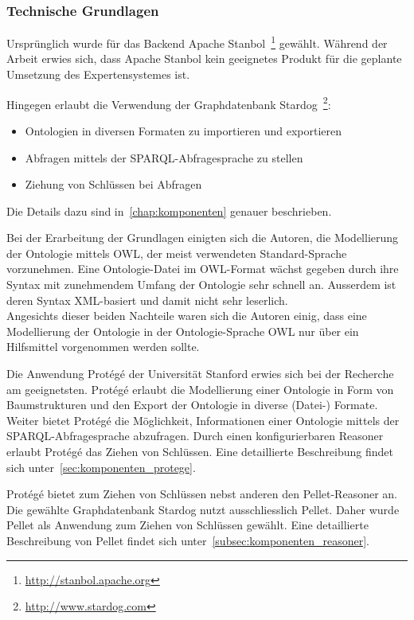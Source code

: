 \subsubsection{Technische Grundlagen}
\label{ssubsec:vorgehen:grundlagen:technisch}
Ursprünglich wurde für das Backend Apache Stanbol~\footnote{\url{http://stanbol.apache.org}} gewählt. Während der Arbeit erwies sich, dass Apache Stanbol kein geeignetes Produkt für die geplante Umsetzung des Expertensystemes ist.

Hingegen erlaubt die Verwendung der Graphdatenbank Stardog~\footnote{\url{http://www.stardog.com}}:
\begin{itemize}
    \item Ontologien in diversen Formaten zu importieren und exportieren
    \item Abfragen mittels der SPARQL-Abfragesprache zu stellen
    \item Ziehung von Schlüssen bei Abfragen
\end{itemize}
Die Details dazu sind in~\autoref{chap:komponenten} genauer beschrieben.

Bei der Erarbeitung der Grundlagen einigten sich die Autoren, die Modellierung der Ontologie mittels OWL, der meist verwendeten Standard-Sprache vorzunehmen. Eine Ontologie-Datei im OWL-Format wächst gegeben durch ihre Syntax mit zunehmendem Umfang der Ontologie sehr schnell an. Ausserdem ist deren Syntax XML-basiert und damit nicht sehr leserlich.\\
Angesichts dieser beiden Nachteile waren sich die Autoren einig, dass eine Modellierung der Ontologie in der Ontologie-Sprache OWL nur über ein Hilfsmittel vorgenommen werden sollte.

Die Anwendung Protégé der Universität Stanford erwies sich bei der Recherche am geeignetsten. Protégé erlaubt die Modellierung einer Ontologie in Form von Baumstrukturen und den Export der Ontologie in diverse (Datei-) Formate. Weiter bietet Protégé die Möglichkeit, Informationen einer Ontologie mittels der SPARQL-Abfragesprache abzufragen. Durch einen konfigurierbaren Reasoner erlaubt Protégé das Ziehen von Schlüssen. Eine detaillierte Beschreibung findet sich unter~\autoref{sec:komponenten_protege}.

Protégé bietet zum Ziehen von Schlüssen nebst anderen den Pellet-Reasoner an. Die gewählte Graphdatenbank Stardog nutzt ausschliesslich Pellet. Daher wurde Pellet als Anwendung zum Ziehen von Schlüssen gewählt. Eine detaillierte Beschreibung von Pellet findet sich unter~\autoref{subsec:komponenten_reasoner}.


